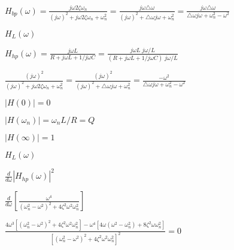 \documentclass{article}
\def\lthtmlcheckvsize{\ifdim\ht\sizebox<\vsize 
  \ifdim\wd\sizebox<\hsize\expandafter\hfill\fi \expandafter\vfill
  \else\expandafter\vss\fi}%
\begin{document}
{\newpage\clearpage
{}%
$\displaystyle H_{bp}(\omega)=\frac{j\omega 2\zeta \omega_n}{(j\omega)^2
+j\omega 2\zeta \omega_n+\omega_n^2}
=\frac{j\omega \triangle \omega}
{(j\omega)^2+\triangle \omega j\omega+\omega_n^2}
=\frac{j\omega \triangle \omega}
{\triangle \omega j\omega+\omega_n^2-\omega^2}$%
\lthtmlindisplaymathZ
\lthtmlcheckvsize\clearpage}

{\newpage\clearpage
{}%
$\displaystyle H_L(\omega)$%
\lthtmlindisplaymathZ
\lthtmlcheckvsize\clearpage}

{\newpage\clearpage
{}%
$\displaystyle H_{hp}(\omega)=\frac{j\omega L}{R+j\omega L+1/j\omega C}
=\frac{j\omega L\;j\omega/L}{(R+j\omega L+1/j\omega C)\;j\omega/L}$%
\lthtmlindisplaymathZ
\lthtmlcheckvsize\clearpage}

{\newpage\clearpage
{}%
$\displaystyle \frac{(j\omega)^2}{(j\omega)^2+j\omega 2\zeta \omega_n+\omega_n^2}
=\frac{(j\omega)^2}{(j\omega)^2+\triangle \omega j\omega +\omega_n^2}
=\frac{-\omega^2}{\triangle \omega j\omega +\omega_n^2-\omega^2}
  $%
\lthtmlindisplaymathZ
\lthtmlcheckvsize\clearpage}

{\newpage\clearpage
{}%
$ |H(0)|=0$%
\lthtmlindisplaymathZ
\lthtmlcheckvsize\clearpage}

{\newpage\clearpage
{}%
$ |H(\omega_n)|=\omega_nL/R=Q$%
\lthtmlindisplaymathZ
\lthtmlcheckvsize\clearpage}

{\newpage\clearpage
{}%
$ |H(\infty)|=1$%
\lthtmlindisplaymathZ
\lthtmlcheckvsize\clearpage}

{\newpage\clearpage
{}%
$ H_L(\omega)$%
\lthtmlindisplaymathZ
\lthtmlcheckvsize\clearpage}

{\newpage\clearpage
{}%
$\displaystyle \frac{d}{d\omega}|H_{hp}(\omega)|^2$%
\lthtmlindisplaymathZ
\lthtmlcheckvsize\clearpage}

{\newpage\clearpage
{}%
$\displaystyle \frac{d}{d\omega}\left[\frac{\omega^4}{(\omega_n^2-\omega^2)^2
+4\zeta^2\omega^2\omega_n^2}\right]$%
\lthtmlindisplaymathZ
\lthtmlcheckvsize\clearpage}

{\newpage\clearpage
{}%
$\displaystyle \frac{4\omega^3[(\omega_n^2-\omega^2)^2+4\zeta^2\omega^2\omega_n^2]
-\omega^4[4\omega(\omega^2-\omega^2_n)+8\zeta^2\omega\omega_n^2]}{[(\omega_n^2-\omega^2)^2+4\zeta^2\omega^2\omega_n^2]^2}  =0$%
\lthtmlindisplaymathZ
\lthtmlcheckvsize\clearpage}
\end{document}
